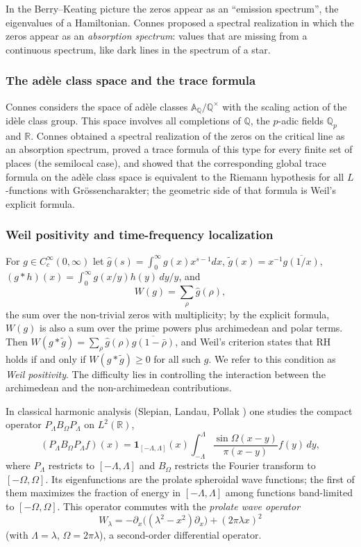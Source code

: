 \documentclass[11pt]{amsart}
\theoremstyle{definition}
\theoremstyle{remark}
\begin{document}
In the Berry--Keating picture the zeros appear as an ``emission spectrum'', the eigenvalues of a Hamiltonian. Connes \cite{connes1999} proposed a spectral realization in which the zeros appear as an \emph{absorption spectrum}: values that are missing from a continuous spectrum, like dark lines in the spectrum of a star.

\subsubsection{The ad\`ele class space and the trace formula}

Connes considers the space of ad\`ele classes $\mathbb{A}_{\mathbb{Q}}/\mathbb{Q}^{\times}$ with the scaling action of the id\`ele class group. This space involves all completions of $\mathbb{Q}$, the $p$-adic fields $\mathbb{Q}_p$ and $\mathbb{R}$. Connes \cite{connes1999} obtained a spectral realization of the zeros on the critical line as an absorption spectrum, proved a trace formula of this type for every finite set of places (the semilocal case), and showed that the corresponding global trace formula on the ad\`ele class space is equivalent to the Riemann hypothesis for all $L$-functions with Gr\"ossencharakter; the geometric side of that formula is Weil's explicit formula.

\subsubsection{Weil positivity and time-frequency localization}

For $g\in C_c^\infty(0,\infty)$ let $\widehat g(s)=\int_0^\infty g(x)x^{s-1}dx$, $\tilde g(x)=x^{-1}\overline{g(1/x)}$, $(g*h)(x)=\int_0^\infty g(x/y)h(y)\,dy/y$, and
\[
W(g)=\sum_\rho\widehat g(\rho),
\]
the sum over the non-trivial zeros with multiplicity; by the explicit formula, $W(g)$ is also a sum over the prime powers plus archimedean and polar terms. Then $W(g*\tilde g)=\sum_\rho\widehat g(\rho)\overline{\widehat g(1-\bar\rho)}$, and Weil's criterion \cite{weil1952} states that RH holds if and only if $W(g*\tilde g)\ge0$ for all such $g$. We refer to this condition as \emph{Weil positivity}. The difficulty lies in controlling the interaction between the archimedean and the non-archimedean contributions.

In classical harmonic analysis (Slepian, Landau, Pollak \cite{slepian1961}) one studies the compact operator $P_\Lambda B_\Omega P_\Lambda$ on $L^2(\mathbb{R})$,
\[
(P_\Lambda B_\Omega P_\Lambda f)(x)=\mathbf 1_{[-\Lambda,\Lambda]}(x)\int_{-\Lambda}^{\Lambda}\frac{\sin\Omega(x-y)}{\pi(x-y)}f(y)\,dy,
\]
where $P_\Lambda$ restricts to $[-\Lambda,\Lambda]$ and $B_\Omega$ restricts the Fourier transform to $[-\Omega,\Omega]$. Its eigenfunctions are the prolate spheroidal wave functions; the first of them maximizes the fraction of energy in $[-\Lambda,\Lambda]$ among functions band-limited to $[-\Omega,\Omega]$. This operator commutes with the \emph{prolate wave operator}
\[
W_\lambda=-\partial_x\bigl((\lambda^2-x^2)\partial_x\bigr)+(2\pi\lambda x)^2
\]
(with $\Lambda=\lambda$, $\Omega=2\pi\lambda$), a second-order differential operator.
\end{document}
